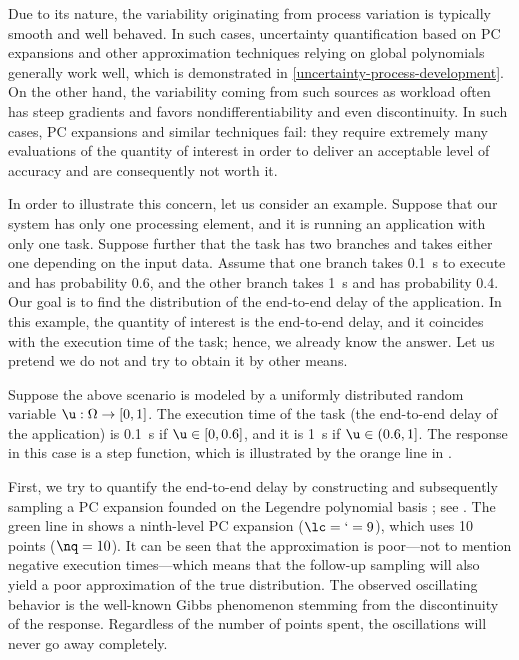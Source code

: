 Due to its nature, the variability originating from process variation is
typically smooth and well behaved. In such cases, uncertainty quantification
based on \ac{PC} expansions \cite{xiu2010} and other approximation techniques
relying on global polynomials generally work well, which is demonstrated in
\cref{uncertainty-process-development}. On the other hand, the variability
coming from such sources as workload often has steep gradients and favors
nondifferentiability and even discontinuity. In such cases, \ac{PC} expansions
and similar techniques fail: they require extremely many evaluations of the
quantity of interest in order to deliver an acceptable level of accuracy and are
consequently not worth it.

In order to illustrate this concern, let us consider an example. Suppose that
our system has only one processing element, and it is running an application
with only one task. Suppose further that the task has two branches and takes
either one depending on the input data. Assume that one branch takes 0.1~s to
execute and has probability 0.6, and the other branch takes 1~s and has
probability 0.4. Our goal is to find the distribution of the end-to-end delay of
the application. In this example, the quantity of interest is the end-to-end
delay, and it coincides with the execution time of the task; hence, we already
know the answer. Let us pretend we do not and try to obtain it by other means.

Suppose the above scenario is modeled by a uniformly distributed random variable
$\u: \Omega \to [0, 1]$. The execution time of the task (the end-to-end delay of
the application) is 0.1~s if $\u \in [0, 0.6]$, and it is 1~s if $\u \in (0.6,
1]$. The response in this case is a step function, which is illustrated by the
orange line in .

First, we try to quantify the end-to-end delay by constructing and subsequently
sampling a \ac{PC} expansion founded on the Legendre polynomial basis
\cite{xiu2010}; see . The green line in
 shows a ninth-level \ac{PC} expansion ($\lc = \lq = 9$),
which uses 10 points ($\nq = 10$). It can be seen that the approximation is
poor---not to mention negative execution times---which means that the follow-up
sampling will also yield a poor approximation of the true distribution. The
observed oscillating behavior is the well-known Gibbs phenomenon stemming from
the discontinuity of the response. Regardless of the number of points spent, the
oscillations will never go away completely.

